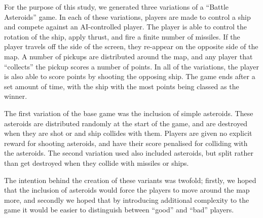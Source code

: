 For the purpose of this study, we generated three variations of a “Battle Asteroids” game. In each of these variations, players are made to control a ship and compete against an AI-controlled player. The player is able to control the rotation of the ship, apply thrust, and fire a finite number of missiles. If the player travels off the side of the screen, they re-appear on the opposite side of the map. A number of pickups are distributed around the map, and any player that “collects” the pickup scores a number of points. In all of the variations, the player is also able to score points by shooting the opposing ship. The game ends after a set amount of time, with the ship with the most points being classed as the winner.

The first variation of the base game was the inclusion of simple asteroids. These asteroids are distributed randomly at the start of the game, and are destroyed when they are shot or and ship collides with them. Players are given no explicit reward for shooting asteroids, and have their score penalised for colliding with the asteroids. The second variation used also included asteroids, but split rather than get destroyed when they collide with missiles or ships.

The intention behind the creation of these variants was twofold; firstly, we hoped that the inclusion of asteroids would force the players to move around the map more, and secondly we hoped that by introducing additional complexity to the game it would be easier to distinguish between “good” and “bad” players.
